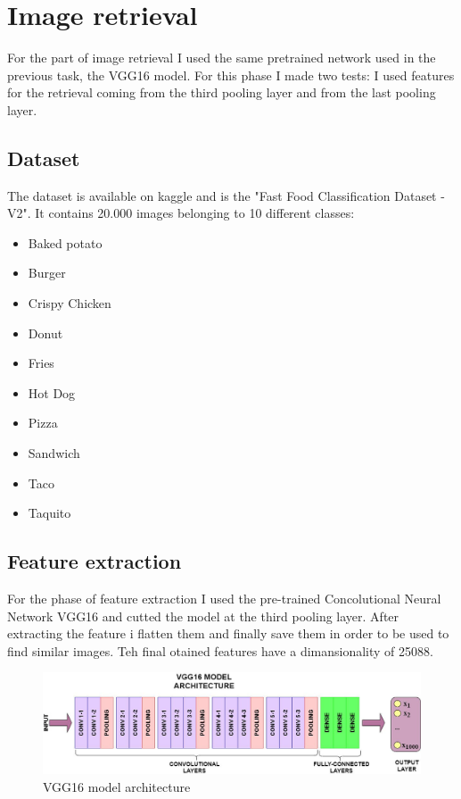 \documentclass[12pt,journal,compsoc]{IEEEtran}
\begin{document}
\section{Image retrieval}
For the part of image retrieval I used the same pretrained network used in the previous task, the VGG16 model. For this phase I made two tests: I used features for the retrieval coming from the third pooling layer and from the last pooling layer.
\subsection{Dataset}
The dataset is available on kaggle and is the "Fast Food Classification Dataset - V2"\cite{dataset3}. It contains 20.000 images belonging to 10 different classes:
\begin{itemize}
	\item Baked potato
	\item Burger
	\item Crispy Chicken
	\item Donut 
	\item Fries 
	\item Hot Dog 
	\item Pizza 
	\item Sandwich
	\item Taco 
	\item Taquito
\end{itemize}
\subsection{Feature extraction}
For the phase of feature extraction I used the pre-trained Concolutional Neural Network VGG16 and cutted the model at the third pooling layer. After extracting the feature i flatten them and finally save them in order to be used to find similar images. Teh final otained features have a dimansionality of 25088.
\begin{figure}[H]
  \begin{center}
  \includegraphics[scale=.20]{./images/vgg16-architecture.width-1200.jpg}
  \end{center}
  \caption{VGG16 model architecture}
\end{figure}
\end{document}
